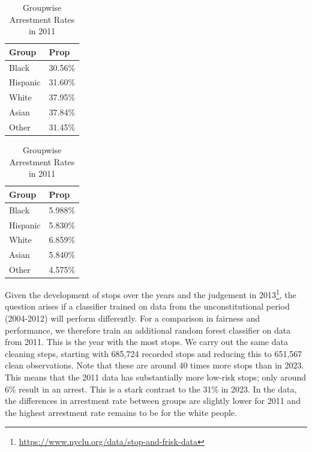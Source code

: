 \begin{table}[!h]
    \centering
    \begin{minipage}{0.48\linewidth}
        \centering
        \begin{tabular}{|ll|}
            \hline
            Group & Prop \\ 
            \hline
            Black & 30.56\% \\ 
            Hispanic & 31.60\% \\ 
            White & 37.95\% \\ 
            Asian & 37.84\% \\ 
            Other & 31.45\% \\ 
            \hline
        \end{tabular}
        \caption{Groupwise Arrestment Rates in 2023} 
        \label{tab:groupwise_arrestment_rates_2023}
    \end{minipage}
    \hfill
    \begin{minipage}{0.48\linewidth}
        \centering
        \begin{tabular}{|ll|}
            \hline
            Group & Prop \\ 
            \hline
            Black & 5.988\% \\ 
            Hispanic & 5.830\% \\ 
            White & 6.859\% \\ 
            Asian & 5.840\% \\ 
            Other & 4.575\% \\ 
            \hline
        \end{tabular}
        \caption{Groupwise Arrestment Rates in 2011} 
        \label{tab:groupwise_arrestment_rates_2011}
    \end{minipage}
\end{table}


    
Given the development of stops over the years and the judgement in 2013\footnote{\href{https://www.nyclu.org/data/stop-and-frisk-data}{https://www.nyclu.org/data/stop-and-frisk-data}}, the question arises if a classifier trained on data from the unconstitutional period (2004-2012) will perform differently.
For a comparison in fairness and performance, we therefore train an additional random forest classifier on data from 2011. This is the year with the most stops. We carry out the same data cleaning steps, starting with 685,724 recorded stops and reducing this to 651,567 clean observations. Note that these are around 40 times more stops than in 2023.
This means that the 2011 data has substantially more low-risk stops; only around 6\% result in an arrest. This is a stark contrast to the 31\% in 2023. In the data, the differences in arrestment rate between groups are slightly lower for 2011 and the highest arrestment rate remains to be for the white people.\\

